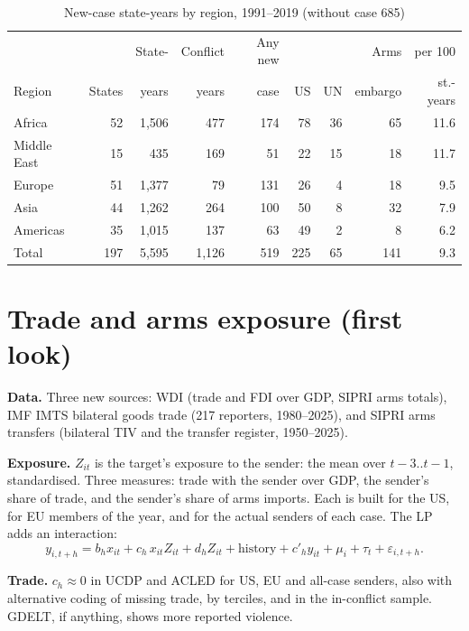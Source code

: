 \documentclass[11pt,a4paper]{article}
\begin{document}
\begin{table}[H]
\centering\small
\caption{New-case state-years by region, 1991--2019 (without case 685)}
\label{tab:regions}
\setlength{\tabcolsep}{4pt}
\begin{tabular}{@{}lrrrrrrrr@{}}
\toprule
 & & State- & Conflict & Any new & & & Arms & per 100 \\
Region & States & years & years & case & US & UN & embargo & st.-years \\
\midrule
Africa      & 52 & 1{,}506 & 477 & 174 & 78 & 36 & 65 & 11.6 \\
Middle East & 15 &    435 & 169 &  51 & 22 & 15 & 18 & 11.7 \\
Europe      & 51 & 1{,}377 &  79 & 131 & 26 &  4 & 18 &  9.5 \\
Asia        & 44 & 1{,}262 & 264 & 100 & 50 &  8 & 32 &  7.9 \\
Americas    & 35 & 1{,}015 & 137 &  63 & 49 &  2 &  8 &  6.2 \\
\midrule
Total       & 197 & 5{,}595 & 1{,}126 & 519 & 225 & 65 & 141 & 9.3 \\
\bottomrule
\end{tabular}
\end{table}

\section{Trade and arms exposure (first look)}
\label{sec:exposure}

\textbf{Data.} Three new sources: WDI (trade and FDI over GDP, SIPRI arms totals), IMF IMTS bilateral goods trade
(217 reporters, 1980--2025), and SIPRI arms transfers (bilateral TIV and the transfer register, 1950--2025).

\textbf{Exposure.} $Z_{it}$ is the target's exposure to the sender: the mean over $t-3..t-1$, standardised. Three
measures: trade with the sender over GDP, the sender's share of trade, and the sender's share of arms imports. Each
is built for the US, for EU members of the year, and for the actual senders of each case. The LP adds an
interaction:
\begin{equation}
  y_{i,t+h} = b_h x_{it} + c_h\, x_{it} Z_{it} + d_h Z_{it} + \text{history} + c'_h y_{it} + \mu_i + \tau_t + \varepsilon_{i,t+h}.
\end{equation}

\textbf{Trade.} $c_h \approx 0$ in UCDP and ACLED for US, EU and all-case senders, also with alternative coding of
missing trade, by terciles, and in the in-conflict sample. GDELT, if anything, shows more reported violence.
\end{document}
